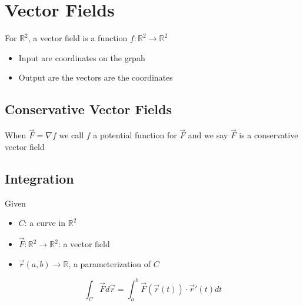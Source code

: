 \section{Vector Fields}

  For $ \mathbb{R}^{2} $, a vector field is a function
  $ f: \mathbb{R}^{2} \to \mathbb{R}^{2} $
  \begin{itemize}
    \item Input are coordinates on the grpah
    \item Output are the vectors are the coordinates
  \end{itemize}

  \subsection{Conservative Vector Fields}

    When $ \vec{F} = \nabla f $ we call $ f $ a potential function
    for $ \vec{F} $ and we say $ \vec{F} $ is a conservative vector field

  \subsection{Integration}

    Given
    \begin{itemize}
      \item $ C $: a curve in $ \mathbb{R}^{2} $
      \item $ \vec{F}: \mathbb{R}^{2} \to \mathbb{R}^{2} $: a vector field
      \item $ \vec{r}\left( a, b \right) \to \mathbb{R} $, a parameterization
      of $ C $
    \end{itemize}

    \begin{equation}
      \int_{C} \vec{F} d\vec{r}
        = \int_{a}^{b} \vec{F}\left( \vec{r} \left( t \right) \right)
        \cdot \vec{r}'\left( t \right) dt
    \end{equation}